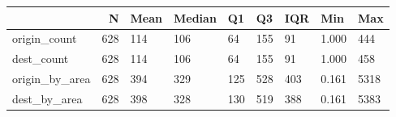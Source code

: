 \begin{tabular}{lrlllllll}
\toprule
 & N & Mean & Median & Q1 & Q3 & IQR & Min & Max \\
\midrule
origin\_count & 628 & 114 & 106 & 64 & 155 & 91 & 1.000 & 444 \\
dest\_count & 628 & 114 & 106 & 64 & 155 & 91 & 1.000 & 458 \\
origin\_by\_area & 628 & 394 & 329 & 125 & 528 & 403 & 0.161 & 5318 \\
dest\_by\_area & 628 & 398 & 328 & 130 & 519 & 388 & 0.161 & 5383 \\
\bottomrule
\end{tabular}
